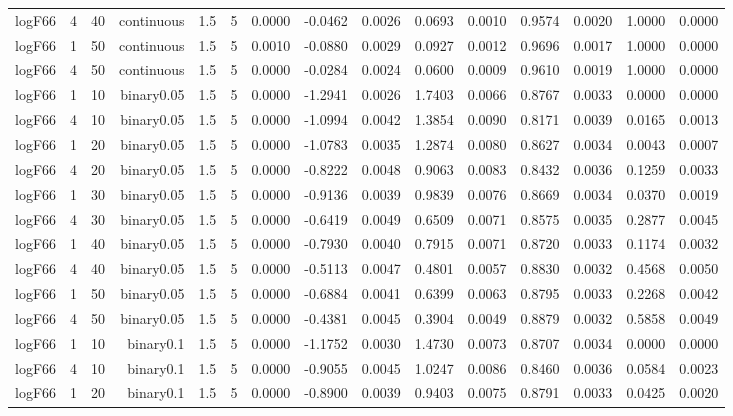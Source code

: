 \begin{longtable}{rrrrrrrrrrrrrrr}
  logF66 & 4 & 40 & continuous & 1.5 & 5 & 0.0000 & -0.0462 & 0.0026 & 0.0693 & 0.0010 & 0.9574 & 0.0020 & 1.0000 & 0.0000 \\ 
  logF66 & 1 & 50 & continuous & 1.5 & 5 & 0.0010 & -0.0880 & 0.0029 & 0.0927 & 0.0012 & 0.9696 & 0.0017 & 1.0000 & 0.0000 \\ 
  logF66 & 4 & 50 & continuous & 1.5 & 5 & 0.0000 & -0.0284 & 0.0024 & 0.0600 & 0.0009 & 0.9610 & 0.0019 & 1.0000 & 0.0000 \\ 
  logF66 & 1 & 10 & binary0.05 & 1.5 & 5 & 0.0000 & -1.2941 & 0.0026 & 1.7403 & 0.0066 & 0.8767 & 0.0033 & 0.0000 & 0.0000 \\ 
  logF66 & 4 & 10 & binary0.05 & 1.5 & 5 & 0.0000 & -1.0994 & 0.0042 & 1.3854 & 0.0090 & 0.8171 & 0.0039 & 0.0165 & 0.0013 \\ 
  logF66 & 1 & 20 & binary0.05 & 1.5 & 5 & 0.0000 & -1.0783 & 0.0035 & 1.2874 & 0.0080 & 0.8627 & 0.0034 & 0.0043 & 0.0007 \\ 
  logF66 & 4 & 20 & binary0.05 & 1.5 & 5 & 0.0000 & -0.8222 & 0.0048 & 0.9063 & 0.0083 & 0.8432 & 0.0036 & 0.1259 & 0.0033 \\ 
  logF66 & 1 & 30 & binary0.05 & 1.5 & 5 & 0.0000 & -0.9136 & 0.0039 & 0.9839 & 0.0076 & 0.8669 & 0.0034 & 0.0370 & 0.0019 \\ 
  logF66 & 4 & 30 & binary0.05 & 1.5 & 5 & 0.0000 & -0.6419 & 0.0049 & 0.6509 & 0.0071 & 0.8575 & 0.0035 & 0.2877 & 0.0045 \\ 
  logF66 & 1 & 40 & binary0.05 & 1.5 & 5 & 0.0000 & -0.7930 & 0.0040 & 0.7915 & 0.0071 & 0.8720 & 0.0033 & 0.1174 & 0.0032 \\ 
  logF66 & 4 & 40 & binary0.05 & 1.5 & 5 & 0.0000 & -0.5113 & 0.0047 & 0.4801 & 0.0057 & 0.8830 & 0.0032 & 0.4568 & 0.0050 \\ 
  logF66 & 1 & 50 & binary0.05 & 1.5 & 5 & 0.0000 & -0.6884 & 0.0041 & 0.6399 & 0.0063 & 0.8795 & 0.0033 & 0.2268 & 0.0042 \\ 
  logF66 & 4 & 50 & binary0.05 & 1.5 & 5 & 0.0000 & -0.4381 & 0.0045 & 0.3904 & 0.0049 & 0.8879 & 0.0032 & 0.5858 & 0.0049 \\ 
  logF66 & 1 & 10 & binary0.1 & 1.5 & 5 & 0.0000 & -1.1752 & 0.0030 & 1.4730 & 0.0073 & 0.8707 & 0.0034 & 0.0000 & 0.0000 \\ 
  logF66 & 4 & 10 & binary0.1 & 1.5 & 5 & 0.0000 & -0.9055 & 0.0045 & 1.0247 & 0.0086 & 0.8460 & 0.0036 & 0.0584 & 0.0023 \\ 
  logF66 & 1 & 20 & binary0.1 & 1.5 & 5 & 0.0000 & -0.8900 & 0.0039 & 0.9403 & 0.0075 & 0.8791 & 0.0033 & 0.0425 & 0.0020 \\ 

\end{longtable}

